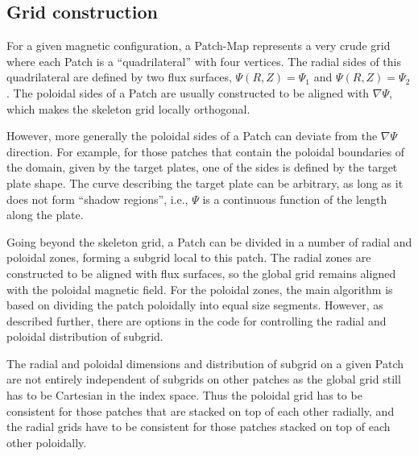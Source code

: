 \subsection{Grid construction}

For a given magnetic configuration, a Patch-Map represents a very
crude grid where each Patch is a ``quadrilateral'' with four vertices.
The radial sides of this quadrilateral are defined by two flux
surfaces, $\Psi(R,Z)=\Psi_1$ and $\Psi(R,Z)=\Psi_2$. The poloidal
sides of a Patch are usually constructed to be aligned with $\nabla
\Psi$, which makes the skeleton grid locally orthogonal. 

However, more generally the poloidal sides of a Patch can deviate from
the $\nabla \Psi$ direction. For example, for those patches that
contain the poloidal boundaries of the domain, given by the target
plates, one of the sides is defined by the target plate shape. The
curve describing the target plate can be arbitrary, as long as it does
not form ``shadow regions'', i.e., $\Psi$ is a continuous function of
the length along the plate.

Going beyond the skeleton grid, a Patch can be divided in a number of
radial and poloidal zones, forming a subgrid local to this patch. The
radial zones are constructed to be aligned with flux surfaces, so the
global grid remains aligned with the poloidal magnetic field. For the
poloidal zones, the main algorithm is based on dividing the patch
poloidally into equal size segments. However, as described further,
there are options in the code for controlling the radial and poloidal
distribution of subgrid.

The radial and poloidal dimensions and distribution of subgrid on a
given Patch are not entirely independent of subgrids on other patches
as the global grid still has to be Cartesian in the index space. Thus
the poloidal grid has to be consistent for those patches that are
stacked on top of each other radially, and the radial grids have to be
consistent for those patches stacked on top of each other poloidally.
